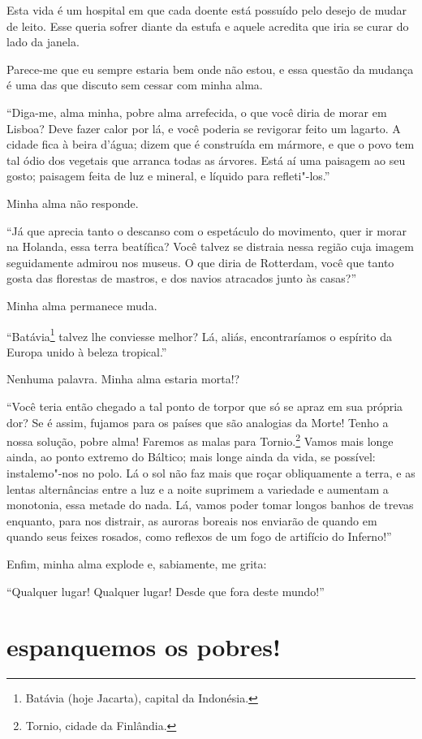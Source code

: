 Esta vida é um hospital em que cada doente está possuído pelo desejo de
mudar de leito. Esse queria sofrer diante da estufa e aquele
acredita que iria se curar do lado da janela.

Parece-me que eu sempre estaria bem onde não estou, e essa questão
da mudança é uma das que discuto sem cessar com minha alma.

“Diga-me, alma minha, pobre alma arrefecida, o que você
diria de morar em Lisboa? Deve fazer calor por lá, e você poderia se revigorar
feito um lagarto. A cidade fica à beira d’água; dizem que é
construída em mármore, e que o povo tem tal ódio dos vegetais que
arranca todas as árvores. Está aí uma paisagem ao seu gosto;
paisagem feita de luz e mineral, e líquido para refleti"-los.''

Minha alma não responde.

“Já que aprecia tanto o descanso com o espetáculo do
movimento, quer ir morar na Holanda, essa terra beatífica? Você
talvez se distraia nessa região cuja imagem seguidamente admirou nos
museus. O que diria de Rotterdam, você que tanto gosta das florestas de
mastros, e dos navios atracados junto às casas?''

Minha alma permanece muda.

“Batávia\footnote{ Batávia (hoje Jacarta), capital da Indonésia.}
 talvez lhe conviesse melhor?
Lá, aliás, encontraríamos o espírito da Europa unido à beleza
tropical.''

Nenhuma palavra. Minha alma estaria morta!?

“Você teria então chegado a tal ponto de torpor que só se
apraz em sua própria dor? Se é assim, fujamos para os países que são
analogias da Morte! Tenho a nossa solução, pobre alma! Faremos as
malas para Tornio.\protect\footnote{  Tornio, cidade da Finlândia.} Vamos mais longe ainda, ao ponto
extremo do Báltico; mais longe ainda da vida, se possível:
instalemo"-nos no polo. Lá o sol não faz mais que roçar obliquamente a terra, e as
lentas alternâncias entre a luz e a noite suprimem a variedade e aumentam a
monotonia, essa metade do nada. Lá, vamos poder tomar longos banhos de
trevas enquanto, para nos distrair, as auroras boreais nos
enviarão de quando em quando seus feixes rosados, como reflexos de um fogo
de artifício do Inferno!''

Enfim, minha alma explode e, sabiamente, me grita:

“Qualquer lugar! Qualquer lugar! Desde que fora deste
mundo!''

\quebra\section[Espanquemos os pobres!]{espanquemos os pobres!}

